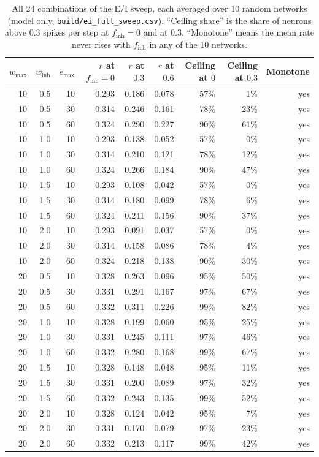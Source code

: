 \documentclass[11pt]{article}
\begin{document}
\begin{table}[t]
\centering
\caption{All 24 combinations of the E/I sweep, each averaged over 10 random networks (model only, \texttt{build/ei\_full\_sweep.csv}). ``Ceiling share'' is the share of neurons above 0.3 spikes per step at $f_{\mathrm{inh}}=0$ and at $0.3$. ``Monotone'' means the mean rate never rises with $f_{\mathrm{inh}}$ in any of the 10 networks.}
\label{tab:ei24}
\footnotesize\setlength{\tabcolsep}{3pt}
\begin{tabular}{rrrrrrrrr}
\toprule
$w_{\max}$ & $w_{\mathrm{inh}}$ & $e_{\max}$ & $\bar r$ at $f_{\mathrm{inh}}{=}0$ & $\bar r$ at $0.3$ & $\bar r$ at $0.6$ & Ceiling at $0$ & Ceiling at $0.3$ & Monotone \\
\midrule
10 & 0.5 & 10 & 0.293 & 0.186 & 0.078 & 57\% & 1\% & yes \\
10 & 0.5 & 30 & 0.314 & 0.246 & 0.161 & 78\% & 23\% & yes \\
10 & 0.5 & 60 & 0.324 & 0.290 & 0.227 & 90\% & 61\% & yes \\
10 & 1.0 & 10 & 0.293 & 0.138 & 0.052 & 57\% & 0\% & yes \\
10 & 1.0 & 30 & 0.314 & 0.210 & 0.121 & 78\% & 12\% & yes \\
10 & 1.0 & 60 & 0.324 & 0.266 & 0.184 & 90\% & 47\% & yes \\
10 & 1.5 & 10 & 0.293 & 0.108 & 0.042 & 57\% & 0\% & yes \\
10 & 1.5 & 30 & 0.314 & 0.180 & 0.099 & 78\% & 6\% & yes \\
10 & 1.5 & 60 & 0.324 & 0.241 & 0.156 & 90\% & 37\% & yes \\
10 & 2.0 & 10 & 0.293 & 0.091 & 0.037 & 57\% & 0\% & yes \\
10 & 2.0 & 30 & 0.314 & 0.158 & 0.086 & 78\% & 4\% & yes \\
10 & 2.0 & 60 & 0.324 & 0.218 & 0.138 & 90\% & 30\% & yes \\
20 & 0.5 & 10 & 0.328 & 0.263 & 0.096 & 95\% & 50\% & yes \\
20 & 0.5 & 30 & 0.331 & 0.291 & 0.167 & 97\% & 67\% & yes \\
20 & 0.5 & 60 & 0.332 & 0.311 & 0.226 & 99\% & 82\% & yes \\
20 & 1.0 & 10 & 0.328 & 0.199 & 0.060 & 95\% & 25\% & yes \\
20 & 1.0 & 30 & 0.331 & 0.245 & 0.111 & 97\% & 46\% & yes \\
20 & 1.0 & 60 & 0.332 & 0.280 & 0.168 & 99\% & 67\% & yes \\
20 & 1.5 & 10 & 0.328 & 0.148 & 0.048 & 95\% & 11\% & yes \\
20 & 1.5 & 30 & 0.331 & 0.200 & 0.089 & 97\% & 32\% & yes \\
20 & 1.5 & 60 & 0.332 & 0.243 & 0.135 & 99\% & 52\% & yes \\
20 & 2.0 & 10 & 0.328 & 0.124 & 0.042 & 95\% & 7\% & yes \\
20 & 2.0 & 30 & 0.331 & 0.170 & 0.079 & 97\% & 23\% & yes \\
20 & 2.0 & 60 & 0.332 & 0.213 & 0.117 & 99\% & 42\% & yes \\
\bottomrule
\end{tabular}
\end{table}
\end{document}
